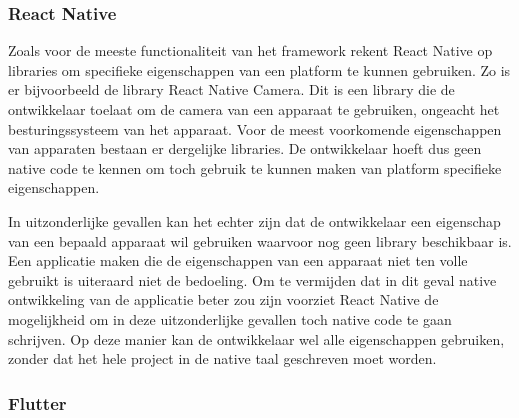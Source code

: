 \subsubsection{React Native}
\label{subsubsec:nativeAPIReactNative}

Zoals voor de meeste functionaliteit van het framework rekent React Native op libraries om specifieke eigenschappen van een platform te kunnen gebruiken. Zo is er bijvoorbeeld de library React Native Camera. Dit is een library die de ontwikkelaar toelaat om de camera van een apparaat te gebruiken, ongeacht het besturingssysteem van het apparaat. Voor de meest voorkomende eigenschappen van apparaten bestaan er dergelijke libraries. De ontwikkelaar hoeft dus geen native code te kennen om toch gebruik te kunnen maken van platform specifieke eigenschappen.

In uitzonderlijke gevallen kan het echter zijn dat de ontwikkelaar een eigenschap van een bepaald apparaat wil gebruiken waarvoor nog geen library beschikbaar is. Een applicatie maken die de eigenschappen van een apparaat niet ten volle gebruikt is uiteraard niet de bedoeling. Om te vermijden dat in dit geval native ontwikkeling van de applicatie beter zou zijn voorziet React Native de mogelijkheid om in deze uitzonderlijke gevallen toch native code te gaan schrijven. Op deze manier kan de ontwikkelaar wel alle eigenschappen gebruiken, zonder dat het hele project in de native taal geschreven moet worden.

\subsubsection{Flutter}
\label{subsubsec:nativeAPIFlutter}





